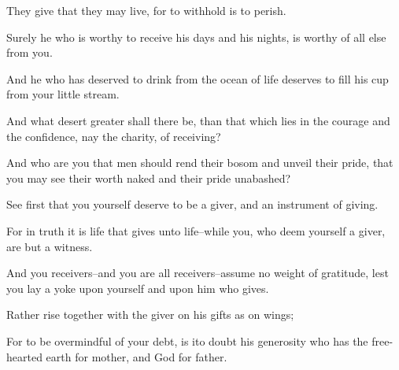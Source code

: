 They give that they may live, for to
withhold is to perish.

Surely he who is worthy to receive his
days and his nights, is worthy of all
else from you.

And he who has deserved to drink from
the ocean of life deserves to fill his
cup from your little stream.

And what desert greater shall there be,
than that which lies in the courage
and the confidence, nay the charity, of
receiving?

And who are you that men should rend
their bosom and unveil their pride,
that you may see their worth naked and
their pride unabashed?

See first that you yourself deserve to
be a giver, and an instrument of giving.

For in truth it is life that gives unto
life--while you, who deem yourself a
giver, are but a witness.

And you receivers--and you are
all receivers--assume no weight of
gratitude, lest you lay a yoke upon
yourself and upon him who gives.

Rather rise together with the giver on
his gifts as on wings;

For to be overmindful of your debt, is
ito doubt his generosity who has the
free-hearted earth for mother, and God
for father.
